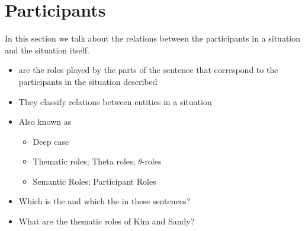 \documentclass[headrule,footrule]{foils}
\begin{document}
\section{Participants} 


In this section we talk about the relations between the participants
in a situation and the situation itself.

\begin{itemize}
\item  {} are the roles played by the parts of the sentence that 
correspond to the participants in the situation described

\item  They classify relations between entities in a situation

\item  Also known as
\begin{itemize}
\item  Deep case \citep{Fillmore:1968}
\item  Thematic roles; Theta roles;   $\theta$-roles
\item  Semantic Roles; Participant Roles
\end{itemize}
\end{itemize}
 
\begin{exe}
  \ex{}
  \ex{}
\end{exe}
\begin{itemize}
\item  Which is the  and which the  in these sentences?\task
\item  What are the thematic roles of Kim and Sandy?\task
\end{itemize}
\end{document}
